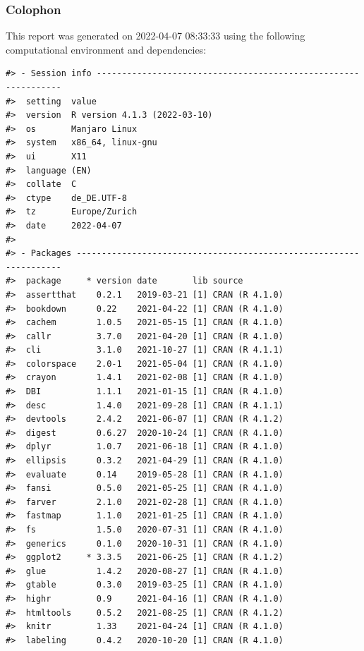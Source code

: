 \documentclass[
]{article}
\begin{document}
\newpage

\hypertarget{colophon}{%
\subsubsection{Colophon}\label{colophon}}

This report was generated on 2022-04-07 08:33:33 using the following computational environment and dependencies:

\begin{verbatim}
#> - Session info ---------------------------------------------------------------
#>  setting  value                       
#>  version  R version 4.1.3 (2022-03-10)
#>  os       Manjaro Linux               
#>  system   x86_64, linux-gnu           
#>  ui       X11                         
#>  language (EN)                        
#>  collate  C                           
#>  ctype    de_DE.UTF-8                 
#>  tz       Europe/Zurich               
#>  date     2022-04-07                  
#> 
#> - Packages -------------------------------------------------------------------
#>  package     * version date       lib source        
#>  assertthat    0.2.1   2019-03-21 [1] CRAN (R 4.1.0)
#>  bookdown      0.22    2021-04-22 [1] CRAN (R 4.1.0)
#>  cachem        1.0.5   2021-05-15 [1] CRAN (R 4.1.0)
#>  callr         3.7.0   2021-04-20 [1] CRAN (R 4.1.0)
#>  cli           3.1.0   2021-10-27 [1] CRAN (R 4.1.1)
#>  colorspace    2.0-1   2021-05-04 [1] CRAN (R 4.1.0)
#>  crayon        1.4.1   2021-02-08 [1] CRAN (R 4.1.0)
#>  DBI           1.1.1   2021-01-15 [1] CRAN (R 4.1.0)
#>  desc          1.4.0   2021-09-28 [1] CRAN (R 4.1.1)
#>  devtools      2.4.2   2021-06-07 [1] CRAN (R 4.1.2)
#>  digest        0.6.27  2020-10-24 [1] CRAN (R 4.1.0)
#>  dplyr         1.0.7   2021-06-18 [1] CRAN (R 4.1.0)
#>  ellipsis      0.3.2   2021-04-29 [1] CRAN (R 4.1.0)
#>  evaluate      0.14    2019-05-28 [1] CRAN (R 4.1.0)
#>  fansi         0.5.0   2021-05-25 [1] CRAN (R 4.1.0)
#>  farver        2.1.0   2021-02-28 [1] CRAN (R 4.1.0)
#>  fastmap       1.1.0   2021-01-25 [1] CRAN (R 4.1.0)
#>  fs            1.5.0   2020-07-31 [1] CRAN (R 4.1.0)
#>  generics      0.1.0   2020-10-31 [1] CRAN (R 4.1.0)
#>  ggplot2     * 3.3.5   2021-06-25 [1] CRAN (R 4.1.2)
#>  glue          1.4.2   2020-08-27 [1] CRAN (R 4.1.0)
#>  gtable        0.3.0   2019-03-25 [1] CRAN (R 4.1.0)
#>  highr         0.9     2021-04-16 [1] CRAN (R 4.1.0)
#>  htmltools     0.5.2   2021-08-25 [1] CRAN (R 4.1.2)
#>  knitr         1.33    2021-04-24 [1] CRAN (R 4.1.0)
#>  labeling      0.4.2   2020-10-20 [1] CRAN (R 4.1.0)

\end{verbatim}
\end{document}
